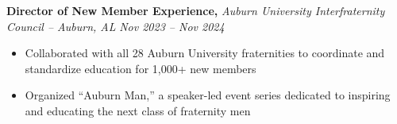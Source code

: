 \documentclass[10pt]{article}       %
\begin{document}
\textbf{Director of New Member Experience,} \textit{Auburn University Interfraternity Council -- Auburn, AL} \hfill \textit{Nov 2023 -- Nov 2024} \\
\begin{itemize}
  \item Collaborated with all 28 Auburn University fraternities to coordinate and standardize education for 1,000+ new members
  \item Organized ``Auburn Man,'' a speaker-led event series dedicated to inspiring and educating the next class of fraternity men
\end{itemize}
\end{document}
